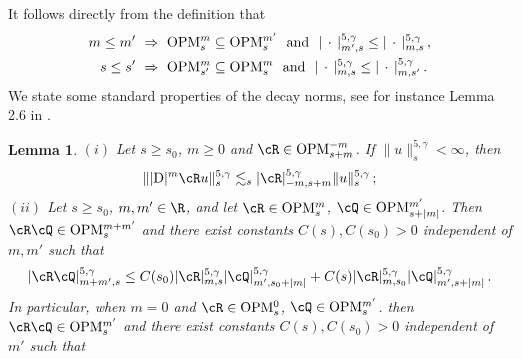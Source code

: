 \documentclass[a4paper,reqno,10pt]{article}
\newtheorem{lem}{Lemma}[section]
\newcommand{\OpM}{{\rm O}{\rm P}{\rm M}}
\begin{document}
It follows directly from the definition that
\begin{align}
    m\leq m' \ & \Rightarrow \ \OpM_{s}^{m} \subseteq \OpM_{s}^{m'} \ \text{ and }\ |\,\cdot\,|_{m',s}^{5,\gamma} \leq |\,\cdot\,|_{m,s}^{5,\gamma}  \,, \label{monotone.OPM}\\
     s\leq s' \ & \Rightarrow \ \OpM_{s'}^{m} \subseteq \OpM_{s}^{m} \ \text{ and } \ |\,\cdot\,|_{m,s}^{5,\gamma} \leq |\,\cdot\,|_{m,s'}^{5,\gamma}  \,.
\end{align}
We state some standard properties of the decay norms, see for instance Lemma 2.6 in \cite{FrMo}. 
\begin{lem}\label{standard prop decay norm}
$(i)$ Let $s \geq s_0$, $m\geq 0$ and $\cR \in \OpM_{s+m}^{-m}$. %
If $\| u \|_s^{5,\gamma} < \infty$, then
\begin{equation}\label{action.matrix.decay.est}
    \| |{\rm D}|^{m}\cR u \|_{s}^{5,\gamma} \lesssim_{s} |\cR|_{-m, s+m}^{5,\gamma} \| u \|_s^{5,\gamma}\,; 
\end{equation}
\noindent $(ii)$ Let $s \geq s_0$, $m, m' \in \R$, and let $\cR \in\OpM_{s}^m$, $\cQ \in \OpM_{s + |m|}^{m'}$. %
Then $\cR \cQ \in \OpM_{s}^{m+m'}$ and there exist constants $C(s),C(s_{0})>0$ independent of $m,m'$ such that
\begin{equation}
   |\cR \cQ|_{m + m', s}^{5,\gamma} \leq C(s_{0}) |\cR|_{m, s}^{5,\gamma} |\cQ|_{m', s_{0} + |m|}^{5,\gamma} + C(s)|\cR|_{m, s_{0}}^{5,\gamma} |\cQ|_{m', s + |m|}^{5,\gamma} \,. 
\end{equation}
In particular, when $m=0$ and $\cR\in\OpM_{s}^{0}$, $\cQ \in \OpM_{s}^{m'}$. %
then $\cR \cQ \in \OpM_{s}^{m'}$ and there exist constants $C(s),C(s_{0})>0$ independent of $m'$ such that
\begin{equation}

\end{equation}
\end{lem}
\end{document}
